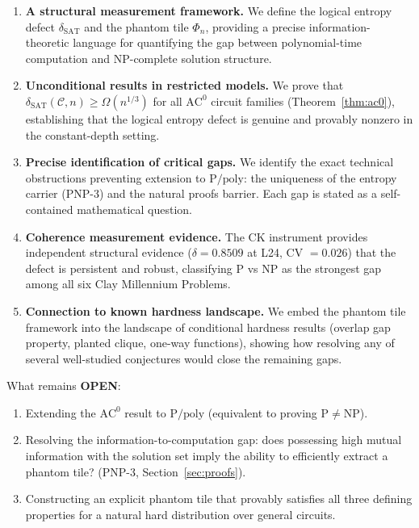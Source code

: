 \documentclass[11pt]{article}
\theoremstyle{definition}
\theoremstyle{remark}
\newcommand{\calC}{\mathcal{C}}
\newcommand{\Ppoly}{\mathrm{P/poly}}
\newcommand{\ACz}{\mathrm{AC}^0}
\newcommand{\dSAT}{\delta_{\mathrm{SAT}}}
\begin{document}
\begin{enumerate}[label=(\alph*),nosep]
  \item \textbf{A structural measurement framework.}  We define the logical
    entropy defect $\dSAT$ and the phantom tile $\Phi_n$, providing a
    precise information-theoretic language for quantifying the gap between
    polynomial-time computation and NP-complete solution structure.

  \item \textbf{Unconditional results in restricted models.}  We prove that
    $\dSAT(\calC, n) \geq \Omega(n^{1/3})$ for all $\ACz$ circuit families
    (Theorem~\ref{thm:ac0}), establishing that the logical entropy defect
    is genuine and provably nonzero in the constant-depth setting.

  \item \textbf{Precise identification of critical gaps.}  We identify the
    exact technical obstructions preventing extension to $\Ppoly$: the
    uniqueness of the entropy carrier (PNP-3) and the natural proofs barrier.
    Each gap is stated as a self-contained mathematical question.

  \item \textbf{Coherence measurement evidence.}  The CK instrument provides
    independent structural evidence ($\delta = 0.8509$ at L24, CV $= 0.026$)
    that the defect is persistent and robust, classifying P vs NP as the
    strongest gap among all six Clay Millennium Problems.

  \item \textbf{Connection to known hardness landscape.}  We embed the
    phantom tile framework into the landscape of conditional hardness results
    (overlap gap property, planted clique, one-way functions), showing how
    resolving any of several well-studied conjectures would close the
    remaining gaps.
\end{enumerate}

\noindent
What remains \textbf{OPEN}:

\begin{enumerate}[label=(\alph*),nosep]
  \item Extending the $\ACz$ result to $\Ppoly$ (equivalent to proving
    $\mathrm{P} \neq \mathrm{NP}$).
  \item Resolving the information-to-computation gap: does possessing
    high mutual information with the solution set imply the ability to
    efficiently extract a phantom tile? (PNP-3, Section~\ref{sec:proofs}).
  \item Constructing an explicit phantom tile that provably satisfies all
    three defining properties for a natural hard distribution over general
    circuits.
\end{enumerate}
\end{document}
